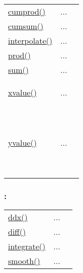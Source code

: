 \textcolor{blue}{}\begin{tabular}{>{\raggedleft}b{3cm}>{\centering}b{0.5cm}>{\raggedright}b{12cm}}
\textcolor{blue}{\hyperlink{cumprod}{cumprod()}}&
...&
 \begin{NoHyper} \nameref{par:Cumulative-product} \end{NoHyper}\tabularnewline
\textcolor{blue}{\hyperlink{cumsum}{cumsum()}}&
...&
 \begin{NoHyper} \nameref{par:Cumulative-sum} \end{NoHyper}\tabularnewline
\textcolor{blue}{\hyperlink{interpolate}{interpolate()}}&
...&
 \begin{NoHyper} \nameref{par:spline-interpolation} \end{NoHyper}\tabularnewline
\textcolor{blue}{\hyperlink{prod}{prod()}}&
...&
 \begin{NoHyper} \nameref{par:Prod} \end{NoHyper}\tabularnewline
\textcolor{blue}{\hyperlink{sum}{sum()}}&
...&
 \begin{NoHyper} \nameref{par:Sum} \end{NoHyper}\tabularnewline
\textcolor{blue}{\hyperlink{xvalue}{xvalue()}}

\textcolor{blue}{~}&
...

\textcolor{blue}{~}&
 \begin{NoHyper} \nameref{par:xvalue} \end{NoHyper}\tabularnewline
\textcolor{blue}{\hyperlink{yvalue}{yvalue()}}

\textcolor{blue}{~}&
...

\textcolor{blue}{~}&
 \begin{NoHyper} \nameref{par:yvalue} \end{NoHyper}\tabularnewline
\end{tabular}


\subsubsection*{: }

\textcolor{blue}{}\begin{tabular}{>{\raggedleft}p{3cm}>{\centering}p{0.5cm}l}
\textcolor{blue}{\hyperlink{ddx}{ddx()}}&
...&
 \begin{NoHyper} \nameref{par:Differentiate-Symbolicly} \end{NoHyper}\tabularnewline
\textcolor{blue}{\hyperlink{diff}{diff()}}&
...&
 \begin{NoHyper} \nameref{par:Differentiate} \end{NoHyper}\tabularnewline
\textcolor{blue}{\hyperlink{integrate}{integrate()}}&
...&
 \begin{NoHyper} \nameref{par:Integrate} \end{NoHyper}\tabularnewline
 \textcolor{blue}{\hyperlink{smooth}{smooth()}}&
...&
 \begin{NoHyper} \nameref{par:Smooth} \end{NoHyper}\tabularnewline
\end{tabular}


